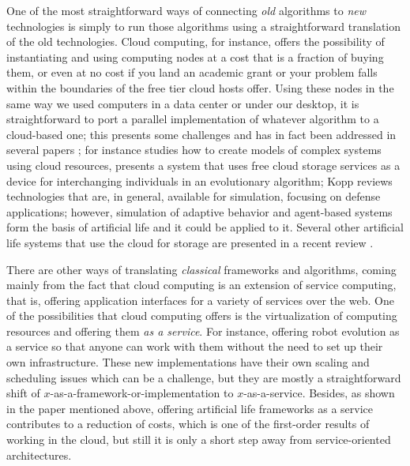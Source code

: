 \documentclass[utf8]{frontiersSCNS} %
\begin{document}
One of the most straightforward ways of connecting {\em old} algorithms to
{\em new} technologies is simply to run those algorithms using a
straightforward translation of the old technologies. Cloud computing,
for instance, offers the possibility of instantiating and using computing nodes
at a cost that is a fraction of buying them, or even at no cost if you
land an academic grant or your problem falls within the boundaries of
the free tier cloud hosts offer. Using these nodes in the same way we
used computers in a data center or under our desktop, it is
straightforward to port a parallel implementation of
whatever algorithm to a cloud-based one; this presents some challenges and
has in fact been addressed in several papers \citep{leclerc2016seamless,DBLP:conf/ecal/Radenski13}; for instance \citep{Medel2017}
studies how to create models of complex systems using cloud resources,
\citep{mericloud,merelo2011evostar,5708434} presents a system that uses free cloud
storage services as a device for interchanging individuals in an
evolutionary algorithm; Kopp \citep{Kopp2016} reviews technologies
that are, in general, available for simulation, focusing on defense
applications; however, simulation of adaptive behavior and agent-based
systems form the basis of artificial life and it could be applied to
it. Several other artificial life systems that use
the cloud for storage are presented in a recent review
\citep{taylor2016webal}.


There are other ways of translating {\em classical} frameworks and
algorithms, coming mainly from the fact that cloud computing is an
extension of service computing, that is, offering application
interfaces for a variety of services over the web. One of the possibilities that cloud computing offers
is the virtualization of computing resources and offering them {\em as a
service}. For instance, offering robot evolution as a service
\citep{du2017robot,chen2010robot} so that anyone can work with them without the
need to set up their own infrastructure. These new
implementations have their own scaling and scheduling issues which can
be a challenge, but they are mostly a straightforward shift
of $x$-as-a-framework-or-implementation to $x$-as-a-service. Besides,
as shown in the paper mentioned above, offering artificial life
frameworks as a service contributes to a
reduction of costs, which is one of the first-order results of working
in the cloud, but still it is only a short step away from
service-oriented architectures.
\end{document}
